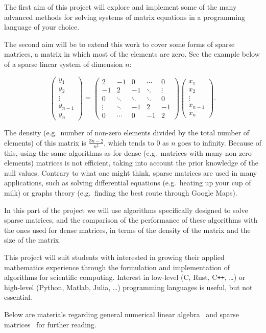 \documentclass{article}
\begin{document}
The first aim of this project will explore and implement some of the many advanced methods for solving systems of matrix equations in a programming language of your choice.

The second aim will be to extend this work to cover some forms of sparse matrices, a matrix in which most of the elements are zero. See the example below of a sparse linear system of dimension $n$:

\begin{equation*}
	\begin{pmatrix}
		y_1     \\
		y_2     \\
		\vdots  \\
		y_{n-1} \\
		y_n
	\end{pmatrix} =
	\begin{pmatrix}
		2      & -1     & 0      & \cdots & 0      \\
		-1     & 2      & -1     & \ddots & \vdots \\
		0      & \ddots & \ddots & \ddots & 0      \\
		\vdots & \ddots & -1     & 2      & -1     \\
		0      & \cdots & 0      & -1     & 2
	\end{pmatrix}
	\begin{pmatrix}
		x_1     \\
		x_2     \\
		\vdots  \\
		x_{n-1} \\
		x_n
	\end{pmatrix}.
\end{equation*}

The density (e.g.\ number of non-zero elements divided by the total number of elements) of this matrix is $\frac{3n-2}{n^2}$, which tends to $0$ as $n$ goes to infinity. Because of this, using the same algorithms as for dense (e.g.\ matrices with many non-zero elements) matrices is not efficient, taking into account the prior knowledge of the null values. Contrary to what one might think, sparse matrices are used in many applications, such as solving differential equations (e.g.\ heating up your cup of milk) or graphs theory (e.g.\ finding the best route through Google Maps).

In this part of the project we will use algorithms specifically designed to solve sparse matrices, and the comparison of the performance of these algorithms with the ones used for dense matrices, in terms of the density of the matrix and the size of the matrix.

This project will suit students with interested in growing their applied mathematics experience through the formulation and implementation of algorithms for scientific computing. Interest in low-level (C, Rust, C\texttt{++}, \dots) or  high-level (Python, Matlab, Julia, \dots) programming languages is useful, but not essential.

Below are materials regarding general numerical linear algebra~\cite{linalg} and sparse matrices~\cite{sparse} for further reading.

\printbibliography[heading=subbibcustom]
\end{document}
